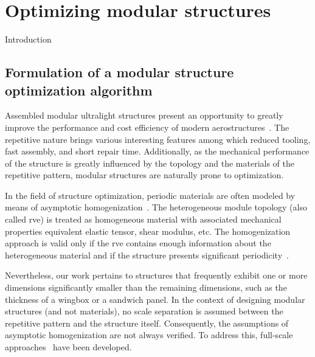 \setchapterpreamble[u]{\margintoc}
\glsresetall %
\chapter{Optimizing modular structures}
Introduction
\section{Formulation of a modular structure optimization algorithm}
Assembled modular ultralight structures present an opportunity to greatly improve the performance and cost efficiency of modern aerostructures~. The repetitive nature brings various interesting features among which reduced tooling, fast assembly, and short repair time. Additionally, as the mechanical performance of the structure is greatly influenced by the topology and the materials of the repetitive pattern, modular structures are naturally prone to optimization.

In the field of structure optimization, periodic materials are often modeled by means of asymptotic homogenization~. The heterogeneous module topology (also called \gls{rve}) is treated as homogeneous material with associated mechanical properties \ie equivalent elastic tensor, shear modulus, etc. The homogenization approach is valid only if the \gls{rve} contains enough information about the heterogeneous material and if the structure presents significant periodicity~. 

Nevertheless, our work pertains to structures that frequently exhibit one or more dimensions significantly smaller than the remaining dimensions, such as the thickness of a wingbox or a sandwich panel. In the context of designing modular structures (and not materials), no scale separation is assumed between the repetitive pattern and the structure itself. Consequently, the assumptions of asymptotic homogenization are not always verified. To address this, full-scale approaches~ have been developed.

